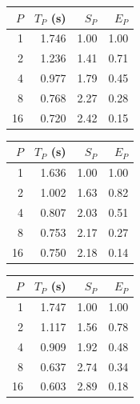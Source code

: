 \begin{tabular}{rrrr}\hline
$P$ & $T_P$ (s) & $S_P$ & $E_P$ \\ \hline
1 & 1.746 & 1.00 & 1.00 \\
2 & 1.236 & 1.41 & 0.71 \\
4 & 0.977 & 1.79 & 0.45 \\
8 & 0.768 & 2.27 & 0.28 \\
16 & 0.720 & 2.42 & 0.15 \\
\hline\end{tabular}

\begin{tabular}{rrrr}\hline
$P$ & $T_P$ (s) & $S_P$ & $E_P$ \\ \hline
1 & 1.636 & 1.00 & 1.00 \\
2 & 1.002 & 1.63 & 0.82 \\
4 & 0.807 & 2.03 & 0.51 \\
8 & 0.753 & 2.17 & 0.27 \\
16 & 0.750 & 2.18 & 0.14 \\
\hline\end{tabular}

\begin{tabular}{rrrr}\hline
$P$ & $T_P$ (s) & $S_P$ & $E_P$ \\ \hline
1 & 1.747 & 1.00 & 1.00 \\
2 & 1.117 & 1.56 & 0.78 \\
4 & 0.909 & 1.92 & 0.48 \\
8 & 0.637 & 2.74 & 0.34 \\
16 & 0.603 & 2.89 & 0.18 \\
\hline\end{tabular}
